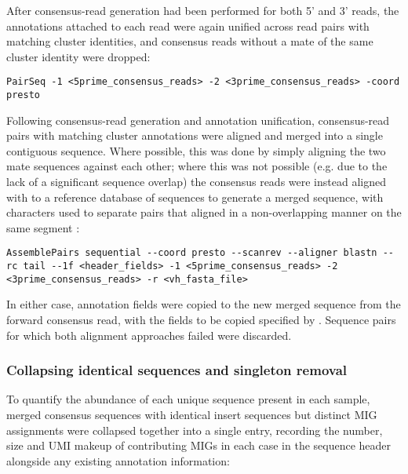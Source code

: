 After consensus-read generation had been performed for both 5' and 3' reads, the annotations attached to each read were again unified across read pairs with matching cluster identities, and consensus reads without a mate of the same cluster identity were dropped:

\begin{lstlisting}
PairSeq -1 <5prime_consensus_reads> -2 <3prime_consensus_reads> -coord presto
\end{lstlisting}

\noindent Following consensus-read generation and annotation unification, consensus-read pairs with matching cluster annotations were aligned and merged into a single contiguous sequence. Where possible, this was done by simply aligning the two mate sequences against each other; where this was not possible (e.g. due to the lack of a significant sequence overlap) the consensus reads were instead aligned with  \parencite{altschul1990blast,altschul1997blast} to a reference database of \vh sequences to generate a merged sequence, with  characters used to separate pairs that aligned in a non-overlapping manner on the same \vh segment \parencite{vanderheiden2014presto}:

\begin{lstlisting}
AssemblePairs sequential --coord presto --scanrev --aligner blastn --rc tail --1f <header_fields> -1 <5prime_consensus_reads> -2 <3prime_consensus_reads> -r <vh_fasta_file>
\end{lstlisting}

\noindent In either case, annotation fields were copied to the new merged sequence from the forward consensus read, with the fields to be copied specified by . Sequence pairs for which both alignment approaches failed were discarded.

\subsubsection{Collapsing identical sequences and singleton removal}
\label{sec:methods_comp_igpreproc_collapse}

To quantify the abundance of each unique sequence present in each sample, merged consensus sequences with identical insert sequences but distinct MIG assignments were collapsed together into a single  entry, recording the number, size and UMI makeup of contributing MIGs in each case in the sequence header alongside any existing annotation information:

